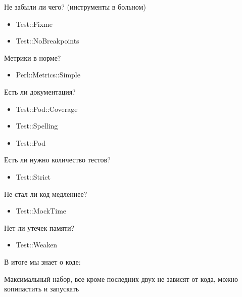 \documentclass[aspectratio=169]{beamer}
\begin{document}
\begin{frame}{Не забыли ли чего? (инструменты в больном)}
\begin{itemize}
\item Test::Fixme
\item Test::NoBreakpoints
\end{itemize}
\end{frame}

\begin{frame}{Метрики в норме?}
\begin{itemize}
\item Perl::Metrics::Simple
\end{itemize}
\end{frame}

\begin{frame}{Есть ли документация?}
\begin{itemize}
\item Test::Pod::Coverage
\item Test::Spelling
\item Test::Pod
\end{itemize}
\end{frame}

\begin{frame}{Есть ли нужно количество тестов?}
\begin{itemize}
\item Test::Strict
\end{itemize}
\end{frame}

\begin{frame}{Не стал ли код медленнее?}
\begin{itemize}
\item Test::MockTime
\end{itemize}
\end{frame}

\begin{frame}{Нет ли утечек памяти?}
\begin{itemize}
\item Test::Weaken
\end{itemize}
\end{frame}

\begin{frame}{В итоге мы знает о коде:}

\end{frame}

\begin{frame}{}
Максимальный набор, все кроме последних двух не зависят от кода, можно копипастить и запускать
\end{frame}
\end{document}
